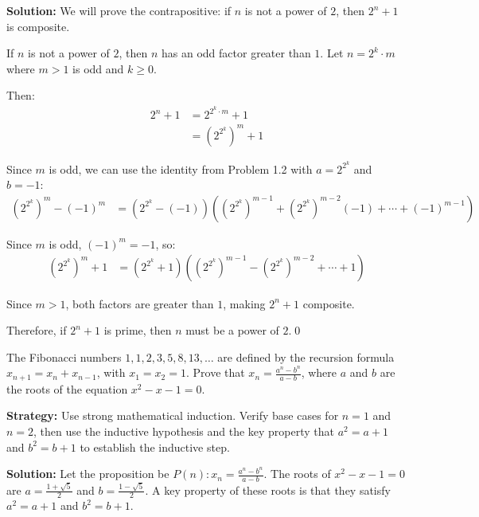 \bigskip\noindent\textbf{Solution:}
We will prove the contrapositive: if $n$ is not a power of $2$, then $2^n + 1$ is composite.

If $n$ is not a power of $2$, then $n$ has an odd factor greater than $1$. Let $n = 2^k \cdot m$ where $m > 1$ is odd and $k \geq 0$.

Then:
\begin{align*}
2^n + 1 &= 2^{2^k \cdot m} + 1 \\
&= (2^{2^k})^m + 1
\end{align*}

Since $m$ is odd, we can use the identity from Problem 1.2 with $a = 2^{2^k}$ and $b = -1$:
\begin{align*}
(2^{2^k})^m - (-1)^m &= (2^{2^k} - (-1))((2^{2^k})^{m-1} + (2^{2^k})^{m-2}(-1) + \cdots + (-1)^{m-1})
\end{align*}

Since $m$ is odd, $(-1)^m = -1$, so:
\begin{align*}
(2^{2^k})^m + 1 &= (2^{2^k} + 1)((2^{2^k})^{m-1} - (2^{2^k})^{m-2} + \cdots + 1)
\end{align*}

Since $m > 1$, both factors are greater than $1$, making $2^n + 1$ composite.

Therefore, if $2^n + 1$ is prime, then $n$ must be a power of $2$.\qed



\begin{problembox}
\begin{problemstatement}
The Fibonacci numbers $1, 1, 2, 3, 5, 8, 13, \dots$ are defined by the recursion formula $x_{n+1} = x_n + x_{n-1}$, with $x_1 = x_2 = 1$. Prove that $x_n = \frac{a^n - b^n}{a - b}$, where $a$ and $b$ are the roots of the equation $x^2 - x - 1 = 0$.
\end{problemstatement}
\end{problembox}

\noindent\textbf{Strategy:} Use strong mathematical induction. Verify base cases for $n=1$ and $n=2$, then use the inductive hypothesis and the key property that $a^2 = a+1$ and $b^2 = b+1$ to establish the inductive step.

\bigskip\noindent\textbf{Solution:}
Let the proposition be $P(n): x_n = \frac{a^n - b^n}{a-b}$. The roots of $x^2 - x - 1 = 0$ are $a = \frac{1+\sqrt{5}}{2}$ and $b = \frac{1-\sqrt{5}}{2}$.
A key property of these roots is that they satisfy $a^2 = a+1$ and $b^2 = b+1$.

